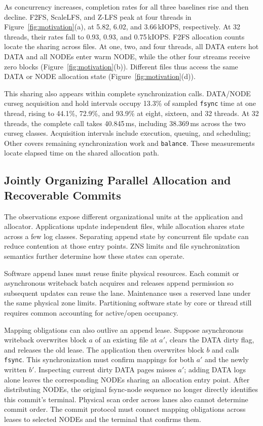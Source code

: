 As concurrency increases, completion rates for all three baselines rise and then decline.
F2FS, ScaleLFS, and Z-LFS peak at four threads in Figure~\ref{fig:motivation}(a), at 5.82, 6.02, and 3.66\,kIOPS, respectively.
At 32 threads, their rates fall to 0.93, 0.93, and 0.75\,kIOPS.
F2FS allocation counts locate the sharing across files.
At one, two, and four threads, all DATA enters hot DATA and all NODEs enter warm NODE, while the other four streams receive zero blocks (Figure~\ref{fig:motivation}(b)).
Different files thus access the same DATA or NODE allocation state (Figure~\ref{fig:motivation}(d)).

This sharing also appears within complete synchronization calls.
DATA/NODE curseg acquisition and hold intervals occupy 13.3\% of sampled \texttt{fsync} time at one thread, rising to 44.1\%, 72.9\%, and 93.9\% at eight, sixteen, and 32 threads.
At 32 threads, the complete call takes 40.845\,ms, including 38.369\,ms across the two curseg classes.
Acquisition intervals include execution, queuing, and scheduling; Other covers remaining synchronization work and \texttt{balance}.
These measurements locate elapsed time on the shared allocation path.

\subsection{Jointly Organizing Parallel Allocation and Recoverable Commits}\label{sec:joint}
The observations expose different organizational units at the application and allocator.
Applications update independent files, while allocation shares state across a few log classes.
Separating append state by concurrent file update can reduce contention at those entry points.
ZNS limits and file synchronization semantics further determine how these states can operate.

Software append lanes must reuse finite physical resources.
Each commit or asynchronous writeback batch acquires and releases append permission so subsequent updates can reuse the lane.
Maintenance uses a reserved lane under the same physical zone limits.
Partitioning software state by core or thread still requires common accounting for active/open occupancy.

Mapping obligations can also outlive an append lease.
Suppose asynchronous writeback overwrites block $a$ of an existing file at $a'$, clears the DATA dirty flag, and releases the old lease.
The application then overwrites block $b$ and calls \texttt{fsync}.
This synchronization must confirm mappings for both $a'$ and the newly written $b'$.
Inspecting current dirty DATA pages misses $a'$; adding DATA logs alone leaves the corresponding NODEs sharing an allocation entry point.
After distributing NODEs, the original fsync-node sequence no longer directly identifies this commit's terminal.
Physical scan order across lanes also cannot determine commit order.
The commit protocol must connect mapping obligations across leases to selected NODEs and the terminal that confirms them.

